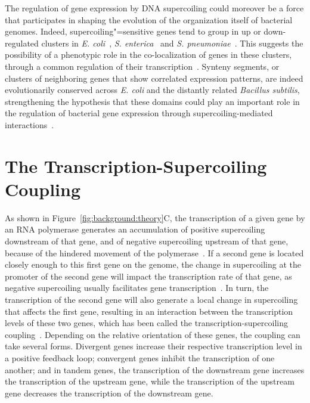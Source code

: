 The regulation of gene expression by DNA supercoiling could moreover be a force that participates in shaping the evolution of the organization itself of bacterial genomes.
Indeed, supercoiling"=sensitive genes tend to group in up or down-regulated clusters in \emph{E. coli}~\citep{peter2004}, \emph{S. enterica}~\citep{webber2013} and \emph{S. pneumoniae}~\citep{ferrandiz2010}.
This suggests the possibility of a phenotypic role in the co-localization of genes in these clusters, through a common regulation of their transcription~\citep{sobetzko2016}.
Synteny segments, or clusters of neighboring genes that show correlated expression patterns, are indeed evolutionarily conserved across \emph{E. coli} and the distantly related \emph{Bacillus subtilis}, strengthening the hypothesis that these domains could play an important role in the regulation of bacterial gene expression through supercoiling-mediated interactions~\citep{junier2016}.


\section{The Transcription-Supercoiling Coupling}

As shown in Figure~\ref{fig:background:theory}C, the transcription of a given gene by an RNA polymerase generates an accumulation of positive supercoiling downstream of that gene, and of negative supercoiling upstream of that gene, because of the hindered movement of the polymerase~\citep{liu1987,visser2022}.
If a second gene is located closely enough to this first gene on the genome, the change in supercoiling at the promoter of the second gene will impact the transcription rate of that gene, as negative supercoiling usually facilitates gene transcription~\citep{forquet2021}.
In turn, the transcription of the second gene will also generate a local change in supercoiling that affects the first gene, resulting in an interaction between the transcription levels of these two genes, which has been called the transcription-supercoiling coupling~\citep{meyer2014}.
Depending on the relative orientation of these genes, the coupling can take several forms.
Divergent genes increase their respective transcription level in a positive feedback loop; convergent genes inhibit the transcription of one another; and in tandem genes, the transcription of the downstream gene increases the transcription of the upstream gene, while the transcription of the upstream gene decreases the transcription of the downstream gene.


